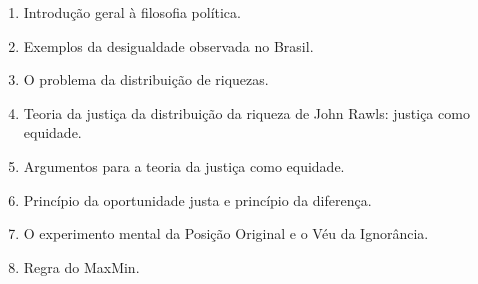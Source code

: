 \documentclass[
	article,			%
	12pt,				%
	twoside,			%
	a4paper,			%
	english,			%
	brazil,				%
	sumario=tradicional
]{abntex2-modelo-plano-de-aula}
\begin{document}
\begin{enumerate}





		\item Introdução geral à filosofia política.
		\item Exemplos da desigualdade observada no Brasil.
		\item O problema da distribuição de riquezas.
		\item Teoria da justiça da distribuição da riqueza de John Rawls: justiça como equidade.
		\item Argumentos para a teoria da justiça como equidade.
		\item Princípio da oportunidade justa e princípio da diferença.
		\item O experimento mental da Posição Original e o Véu da Ignorância.
		\item Regra do MaxMin.





\end{enumerate}
\end{document}
